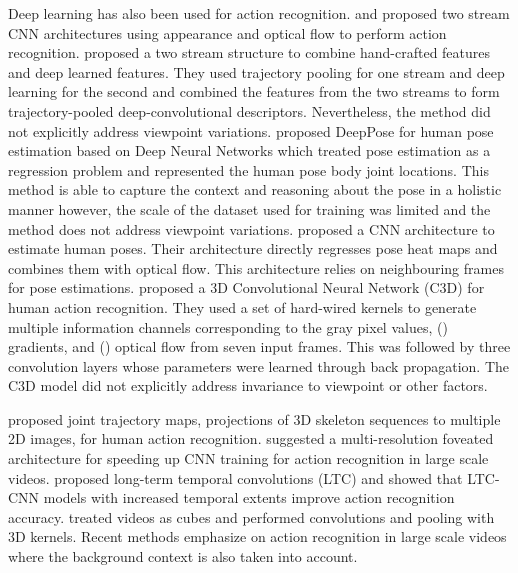 \documentclass[twocolumn]{svjour3}          \smartqed  \usepackage{graphicx}
\begin{document}
Deep learning has also been used for action recognition. \citet{simonyan2014two} and \citet{twoStream_CVPR16} proposed two stream CNN architectures using appearance and optical flow to perform action recognition.\citet{wang2015action} proposed a two stream structure to combine hand-crafted features and deep learned features. They used trajectory pooling for one stream and deep learning for the second and combined the features from the two streams to form trajectory-pooled deep-convolutional descriptors. Nevertheless, the method did not explicitly address viewpoint variations. \citet{toshev2014deeppose} proposed DeepPose for human pose estimation based on Deep Neural Networks which treated pose estimation as a regression problem and represented the human pose body joint locations. This method is able to capture the context and reasoning about the pose in a holistic manner however, the scale of the dataset used for training was limited and the method does not address viewpoint variations. \citet{pfister2015flowing} proposed a CNN architecture to estimate human poses. Their architecture directly regresses pose heat maps and combines them with optical flow. This architecture relies on neighbouring frames for pose estimations. \citet{C3D_pami} proposed a 3D Convolutional Neural Network (C3D) for human action recognition. They used a set of hard-wired kernels to generate multiple information channels corresponding to the gray pixel values, () gradients, and () optical flow from seven input frames. This was followed by three convolution layers whose parameters were learned through back propagation. The C3D model did not explicitly address invariance to viewpoint or other factors.

\citet{wang2016action} proposed joint trajectory maps, projections of 3D skeleton sequences to multiple 2D images, for human action recognition. \citet{karpathy2014large} suggested a multi-resolution foveated architecture for speeding up CNN training for action recognition in large scale videos. \citet{varol2017long} proposed long-term temporal convolutions (LTC) and showed that LTC-CNN models with increased temporal extents improve action recognition accuracy. \citet{tran2015learning} treated videos as cubes and performed convolutions and pooling with 3D kernels. Recent methods \citep{li2016vlad3, zhu2016key, wang2016improving, zhang2016real, su2016hierarchical, wang2016temporal} emphasize on action recognition in large scale videos where the background context is also taken into account. 
\end{document}
